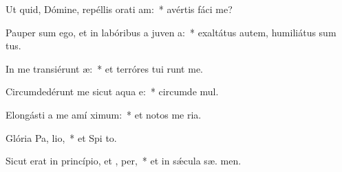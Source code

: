 \item Ut quid, Dómine, repéllis orati am:~* avértis fáci   me?
\item Pauper sum ego, et in labóribus a juven a:~* exaltátus autem, humiliátus sum  tus.
\item In me transiérunt  æ:~* et terróres tui runt me.
\item Circumdedérunt me sicut aqua  e:~* circumde  mul.
\item Elongásti a me amí  ximum:~* et notos me  ria.
\item Glória Pa,  lio,~* et Spi to.
\item Sicut erat in princípio, et ,  per,~* et in sǽcula sæ. men.
